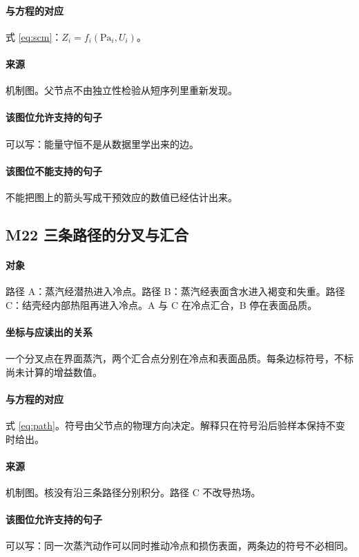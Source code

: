 \paragraph{与方程的对应}
式 \eqref{eq:scm}：$Z_i=f_i(\mathrm{Pa}_i,U_i)$。

\paragraph{来源}
机制图。父节点不由独立性检验从短序列里重新发现。

\paragraph{该图位允许支持的句子}
可以写：能量守恒不是从数据里学出来的边。

\paragraph{该图位不能支持的句子}
不能把图上的箭头写成干预效应的数值已经估计出来。

\subsection{M22 三条路径的分叉与汇合}
\paragraph{对象}
路径 A：蒸汽经潜热进入冷点。路径 B：蒸汽经表面含水进入褐变和失重。路径 C：结壳经内部热阻再进入冷点。A 与 C 在冷点汇合，B 停在表面品质。

\paragraph{坐标与应读出的关系}
一个分叉点在界面蒸汽，两个汇合点分别在冷点和表面品质。每条边标符号，不标尚未计算的增益数值。

\paragraph{与方程的对应}
式 \eqref{eq:path}。符号由父节点的物理方向决定。解释只在符号沿后验样本保持不变时给出。

\paragraph{来源}
机制图。核没有沿三条路径分别积分。路径 C 不改导热场。

\paragraph{该图位允许支持的句子}
可以写：同一次蒸汽动作可以同时推动冷点和损伤表面，两条边的符号不必相同。

